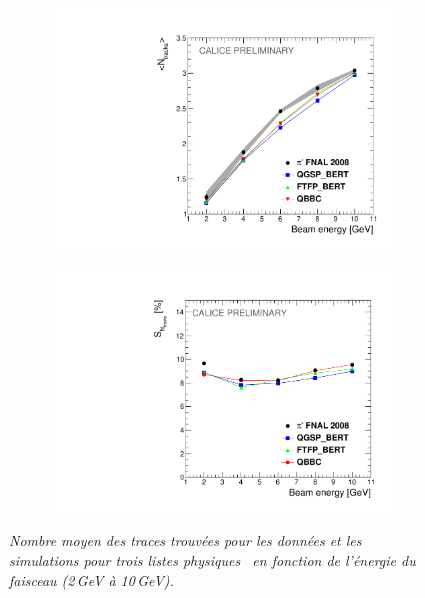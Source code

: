 \begin{figure}
	\centering
	\begin{subfigure}{0.5\textwidth}
		\centering
		\includegraphics[width=.90\linewidth]{ECAL/plots/ntracks-graph.pdf}
		\caption{\label{fig:tracksgraphF} }
	\end{subfigure}%
	\begin{subfigure}{0.5\textwidth}
		\centering
		\includegraphics[width=.90\linewidth]{ECAL/plots/ntracks-graph-delta.pdf}
		\caption{\label{fig:dtracksgraphF}}
	\end{subfigure}
	\caption{\label{fig:fulltrackgraphF} \sl Nombre moyen des traces trouvées pour les données et les simulations  pour trois listes physiques \geant\ en fonction de l'énergie du faisceau (2\,GeV à 10\,GeV). }
\end{figure}


\newpage
